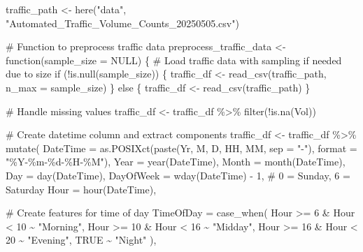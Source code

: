 \documentclass[
  letterpaper,
  DIV=11,
  numbers=noendperiod]{scrreprt}
\newenvironment{Shaded}{\begin{snugshade}}{\end{snugshade}}
\newcommand{\AttributeTok}[1]{\textcolor[rgb]{0.40,0.45,0.13}{#1}}
\newcommand{\CommentTok}[1]{\textcolor[rgb]{0.37,0.37,0.37}{#1}}
\newcommand{\ConstantTok}[1]{\textcolor[rgb]{0.56,0.35,0.01}{#1}}
\newcommand{\ControlFlowTok}[1]{\textcolor[rgb]{0.00,0.23,0.31}{#1}}
\newcommand{\DecValTok}[1]{\textcolor[rgb]{0.68,0.00,0.00}{#1}}
\newcommand{\FunctionTok}[1]{\textcolor[rgb]{0.28,0.35,0.67}{#1}}
\newcommand{\NormalTok}[1]{\textcolor[rgb]{0.00,0.23,0.31}{#1}}
\newcommand{\OtherTok}[1]{\textcolor[rgb]{0.00,0.23,0.31}{#1}}
\newcommand{\SpecialCharTok}[1]{\textcolor[rgb]{0.37,0.37,0.37}{#1}}
\newcommand{\StringTok}[1]{\textcolor[rgb]{0.13,0.47,0.30}{#1}}
\begin{document}
\begin{Shaded}
\begin{Highlighting}[]
\NormalTok{traffic\_path }\OtherTok{\textless{}{-}} \FunctionTok{here}\NormalTok{(}\StringTok{"data"}\NormalTok{, }\StringTok{"Automated\_Traffic\_Volume\_Counts\_20250505.csv"}\NormalTok{)}

\CommentTok{\# Function to preprocess traffic data}
\NormalTok{preprocess\_traffic\_data }\OtherTok{\textless{}{-}} \ControlFlowTok{function}\NormalTok{(}\AttributeTok{sample\_size =} \ConstantTok{NULL}\NormalTok{) \{}
  \CommentTok{\# Load traffic data with sampling if needed due to size}
  \ControlFlowTok{if}\NormalTok{ (}\SpecialCharTok{!}\FunctionTok{is.null}\NormalTok{(sample\_size)) \{}
\NormalTok{    traffic\_df }\OtherTok{\textless{}{-}} \FunctionTok{read\_csv}\NormalTok{(traffic\_path, }\AttributeTok{n\_max =}\NormalTok{ sample\_size)}
\NormalTok{  \} }\ControlFlowTok{else}\NormalTok{ \{}
\NormalTok{    traffic\_df }\OtherTok{\textless{}{-}} \FunctionTok{read\_csv}\NormalTok{(traffic\_path)}
\NormalTok{  \}}
  
  \CommentTok{\# Handle missing values}
\NormalTok{  traffic\_df }\OtherTok{\textless{}{-}}\NormalTok{ traffic\_df }\SpecialCharTok{\%\textgreater{}\%}
    \FunctionTok{filter}\NormalTok{(}\SpecialCharTok{!}\FunctionTok{is.na}\NormalTok{(Vol))}
  
  \CommentTok{\# Create datetime column and extract components}
\NormalTok{  traffic\_df }\OtherTok{\textless{}{-}}\NormalTok{ traffic\_df }\SpecialCharTok{\%\textgreater{}\%}
    \FunctionTok{mutate}\NormalTok{(}
      \AttributeTok{DateTime =} \FunctionTok{as.POSIXct}\NormalTok{(}\FunctionTok{paste}\NormalTok{(Yr, M, D, HH, MM, }\AttributeTok{sep =} \StringTok{"{-}"}\NormalTok{), }\AttributeTok{format =} \StringTok{"\%Y{-}\%m{-}\%d{-}\%H{-}\%M"}\NormalTok{),}
      \AttributeTok{Year =} \FunctionTok{year}\NormalTok{(DateTime),}
      \AttributeTok{Month =} \FunctionTok{month}\NormalTok{(DateTime),}
      \AttributeTok{Day =} \FunctionTok{day}\NormalTok{(DateTime),}
      \AttributeTok{DayOfWeek =} \FunctionTok{wday}\NormalTok{(DateTime) }\SpecialCharTok{{-}} \DecValTok{1}\NormalTok{,  }\CommentTok{\# 0 = Sunday, 6 = Saturday}
      \AttributeTok{Hour =} \FunctionTok{hour}\NormalTok{(DateTime),}
      
      \CommentTok{\# Create features for time of day}
      \AttributeTok{TimeOfDay =} \FunctionTok{case\_when}\NormalTok{(}
\NormalTok{        Hour }\SpecialCharTok{\textgreater{}=} \DecValTok{6} \SpecialCharTok{\&}\NormalTok{ Hour }\SpecialCharTok{\textless{}} \DecValTok{10} \SpecialCharTok{\textasciitilde{}} \StringTok{"Morning"}\NormalTok{,}
\NormalTok{        Hour }\SpecialCharTok{\textgreater{}=} \DecValTok{10} \SpecialCharTok{\&}\NormalTok{ Hour }\SpecialCharTok{\textless{}} \DecValTok{16} \SpecialCharTok{\textasciitilde{}} \StringTok{"Midday"}\NormalTok{,}
\NormalTok{        Hour }\SpecialCharTok{\textgreater{}=} \DecValTok{16} \SpecialCharTok{\&}\NormalTok{ Hour }\SpecialCharTok{\textless{}} \DecValTok{20} \SpecialCharTok{\textasciitilde{}} \StringTok{"Evening"}\NormalTok{,}
        \ConstantTok{TRUE} \SpecialCharTok{\textasciitilde{}} \StringTok{"Night"}
\NormalTok{      ),}
      

\end{Highlighting}
\end{Shaded}
\end{document}
